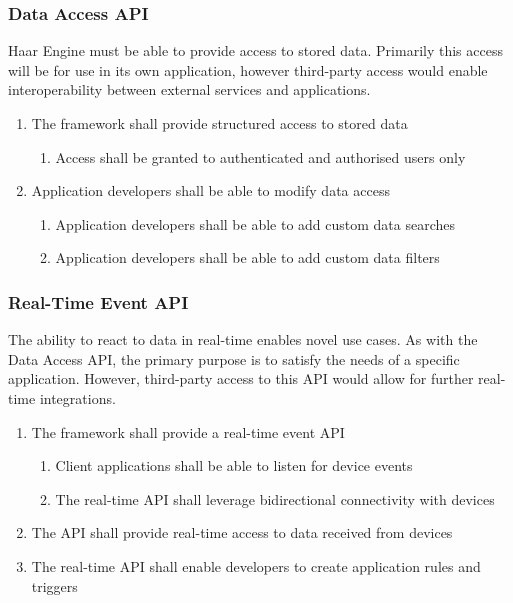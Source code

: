       \subsubsection{Data Access API}
        Haar Engine must be able to provide access to stored data. Primarily this access will be for use in its own application, however third-party access would enable interoperability between external services and applications.

        \begin{enumerate}
          \item The framework shall provide structured access to stored data
          \begin{enumerate}
            \item Access shall be granted to authenticated and authorised users only
          \end{enumerate}
          \item Application developers shall be able to modify data access
          \begin{enumerate}
            \item Application developers shall be able to add custom data searches
            \item Application developers shall be able to add custom data filters
          \end{enumerate}
        \end{enumerate}

      \subsubsection{Real-Time Event API}
        The ability to react to data in real-time enables novel use cases. As with the Data Access API, the primary purpose is to satisfy the needs of a specific application. However, third-party access to this API would allow for further real-time integrations.

        \begin{enumerate}
          \item The framework shall provide a real-time event API
          \begin{enumerate}
            \item Client applications shall be able to listen for device events
            \item The real-time API shall leverage bidirectional connectivity with devices
          \end{enumerate}
          \item The API shall provide real-time access to data received from devices
          \item The real-time API shall enable developers to create application rules and triggers
        \end{enumerate}

